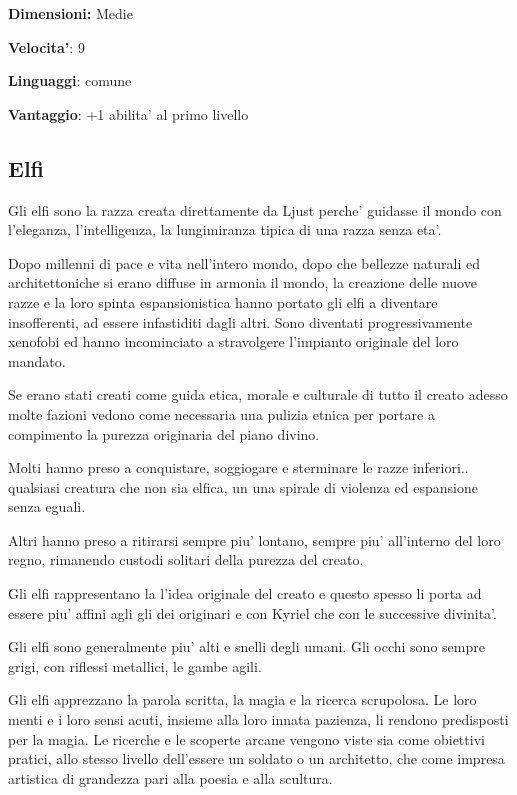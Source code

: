 \documentclass[a4paper,11pt,twoside,openany]{dndbook}
\begin{document}
\textbf{Dimensioni:} Medie

\textbf{Velocita'}: 9

\textbf{Linguaggi}: comune

\textbf{Vantaggio}: +1 abilita' al primo livello

\subsection{Elfi}

\label{elfi}

Gli elfi sono la razza creata direttamente da Ljust perche' guidasse il mondo con l'eleganza, l'intelligenza, la lungimiranza tipica di una razza senza eta'.

Dopo millenni di pace e vita nell'intero mondo, dopo che bellezze naturali ed architettoniche si erano diffuse in armonia il mondo, la creazione delle nuove razze e la loro spinta espansionistica hanno portato gli elfi a diventare insofferenti, ad essere infastiditi dagli altri. Sono diventati progressivamente xenofobi ed hanno incominciato a stravolgere l'impianto originale del loro mandato.

Se erano stati creati come guida etica, morale e culturale di tutto il creato adesso molte fazioni vedono come necessaria una pulizia etnica per portare a compimento la purezza originaria del piano divino. 

Molti hanno preso a conquistare, soggiogare e sterminare le razze inferiori.. qualsiasi creatura che non sia elfica, un una spirale di violenza ed espansione senza eguali.

Altri hanno preso a ritirarsi sempre piu' lontano, sempre piu' all'interno del loro regno, rimanendo custodi solitari della purezza del creato. 

Gli elfi rappresentano la l'idea originale del creato e questo spesso li porta ad essere piu' affini agli gli dei originari e con Kyriel che con le successive divinita'.

Gli elfi sono generalmente piu' alti e snelli degli umani. Gli occhi sono sempre grigi, con riflessi metallici, le gambe agili.

Gli elfi apprezzano la parola scritta, la magia e la ricerca scrupolosa. Le loro menti e i loro sensi acuti, insieme alla loro innata pazienza, li rendono predisposti per la magia. Le ricerche e le scoperte arcane vengono viste sia come obiettivi pratici, allo stesso livello dell'essere un soldato o un architetto, che come impresa artistica di grandezza pari alla poesia e alla scultura.
\end{document}
